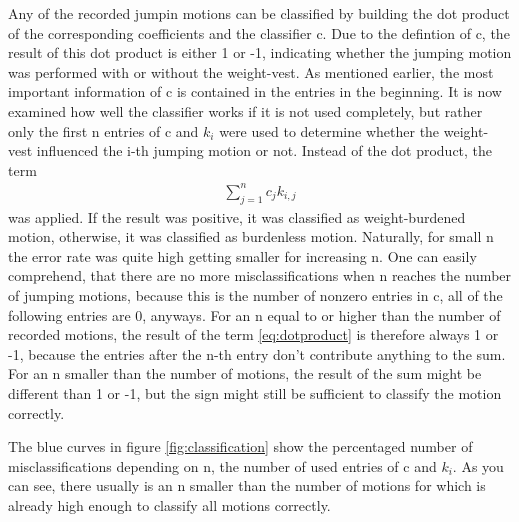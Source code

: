 \documentclass[a4paper]{article}
\begin{document}
Any of the recorded jumpin motions can be classified by building the dot product of the corresponding coefficients and the classifier c.
Due to the defintion of c, the result of this dot product is either 1 or -1, indicating whether the jumping motion was performed with or without the weight-vest.
As mentioned earlier, the most important information of c is contained in the entries in the beginning.
It is now examined how well the classifier works if it is not used completely, but rather only the first n entries of c and $k_{i}$ were used to determine whether the weight-vest influenced the i-th jumping motion or not.
Instead of the dot product, the term
\begin{align}
	\sum\limits_{j=1}^n c_{j} k_{i,j} \label{eq:dotproduct}
\end{align} 
was applied. If the result was positive, it was classified as weight-burdened motion, otherwise, it was classified as burdenless motion.
Naturally, for small n the error rate was quite high getting smaller for increasing n.
One can easily comprehend, that there are no more misclassifications when n reaches the number of jumping motions, because this is the number of nonzero entries in c, all of the following entries are 0, anyways.
For an n equal to or higher than the number of recorded motions, the result of the term \ref{eq:dotproduct} is therefore always 1 or -1, because the entries after the n-th entry don't contribute anything to the sum.
For an n smaller than the number of motions, the result of the sum might be different than 1 or -1, but the sign might still be sufficient to classify the motion correctly.

The blue curves in figure \ref{fig:classification} show the percentaged number of misclassifications depending on n, the number of used entries of c and $k_{i}$. As you can see, there usually is an n smaller than the number of motions for which is already high enough to classify all motions correctly.
\end{document}
